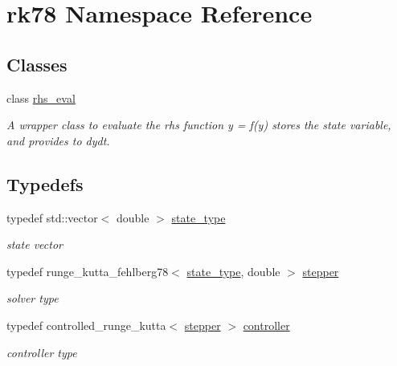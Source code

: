 \hypertarget{namespacerk78}{}\section{rk78 Namespace Reference}
\label{namespacerk78}
\subsection*{Classes}
\begin{DoxyCompactItemize}
\item 
class \hyperlink{classrk78_1_1rhs__eval}{rhs\+\_\+eval}
\begin{DoxyCompactList}\small\item\em A wrapper class to evaluate the rhs function y\textquotesingle{} = f(y) stores the state variable, and provides to dydt. \end{DoxyCompactList}\end{DoxyCompactItemize}
\subsection*{Typedefs}
\begin{DoxyCompactItemize}
\item 
typedef std\+::vector$<$ double $>$ \hyperlink{namespacerk78_adee5ce562c6782cdcf0bd77d751c739a}{state\+\_\+type}
\begin{DoxyCompactList}\small\item\em state vector \end{DoxyCompactList}\item 
typedef runge\+\_\+kutta\+\_\+fehlberg78$<$ \hyperlink{namespacerk78_adee5ce562c6782cdcf0bd77d751c739a}{state\+\_\+type}, double $>$ \hyperlink{namespacerk78_ac6e4b40bcf9a8f507a0bb1260f92777e}{stepper}
\begin{DoxyCompactList}\small\item\em solver type \end{DoxyCompactList}\item 
typedef controlled\+\_\+runge\+\_\+kutta$<$ \hyperlink{namespacerk78_ac6e4b40bcf9a8f507a0bb1260f92777e}{stepper} $>$ \hyperlink{namespacerk78_aba972d6260988e04e23d64437536c04c}{controller}
\begin{DoxyCompactList}\small\item\em controller type \end{DoxyCompactList}\end{DoxyCompactItemize}
